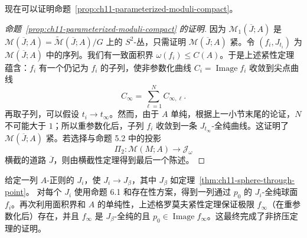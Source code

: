 现在可以证明命题~\ref{prop:ch11-parameterized-moduli-compact}。

\begin{proof}[命题~\ref{prop:ch11-parameterized-moduli-compact} 的证明]
因为 $\mathcal M_1(\overline J;A)$ 是
$\mathcal M(\overline J;A)=\widetilde{\mathcal M}(\overline J;A)/G$ 上的 $S^2$-丛，只需证明 $\mathcal M(\overline J;A)$ 紧。令
$(f_i,J_{t_i})$ 为 $\mathcal M(\overline J;A)$ 中的序列。我们有一致面积界
$\omega(f_i)\leq C(A)$。于是上述紧性定理蕴含：$f_i$ 有一个仍记为 $f_i$ 的子列，使非参数化曲线 $C_i=\operatorname{Image}f_i$ 收敛到尖点曲线
\[
 C_\infty=\sum_{\ell=1}^N C_{\infty,\ell}.
\]
再取子列，可以假设 $t_i\to t_\infty$。然而，由于 $A$ 单纯，根据上一小节末尾的论证，$N$ 不可能大于 $1$；所以重参数化后，子列 $f_i$ 收敛到一条 $J_{t_\infty}$-全纯曲线。这证明了 $\mathcal M(\overline J;A)$ 紧。若选择与命题 5.2 中的投影
\[
 \Pi_2:\mathcal M(M;A)\longrightarrow\mathcal J_\omega
\]
横截的道路 $\overline J$，则由横截性定理得到最后一个陈述。
\end{proof}

给定一列 $A$-正则的 $J_i$，使 $J_i\to J_\beta$，其中 $J_\beta$ 如定理~\ref{thm:ch11-sphere-through-point}。
对每个 $J_i$ 使用命题 6.1 和存在性方案，得到一列通过 $p_0$ 的 $J_i$-全纯球面 $f_i$。再次利用面积界和 $A$ 的单纯性，上述格罗莫夫紧性定理保证极限 $f_\infty$（在重参数化后）存在，并且 $f_\infty$ 是 $J_\beta$-全纯的且
$p_0\in\operatorname{Image}f_\infty$。这最终完成了非挤压定理的证明。
